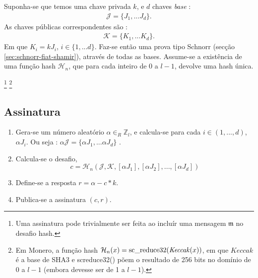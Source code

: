 Suponha-se que temos uma chave privada $k$, e $d$ chaves {\em base} :
\vspace{.175cm}
\begin{align*}
\mathcal{J} = \{J_1,...J_d\} .
\end{align*}
As chaves públicas correspondentes são :
\vspace{.175cm}
\begin{align*}
\mathcal{K} = \{K_1,...K_d\} .
\end{align*}
Em que $K_i = k J_i$, $i \in \{1,...d\}$. Faz-se então uma prova tipo Schnorr (secção \ref{sec:schnorr-fiat-shamir}), através de todas as bases. Assume-se a existência de uma função hash \(\mathcal{H}_n\), que para cada inteiro de 0 a $l-1$, devolve uma hash única.      

\footnote{Uma assinatura pode trivialmente ser feita ao incluír uma mensagem $\mathfrak{m}$ no desafio hash.}
\footnote{Em Monero, a função hash $\mathcal{H}_n(x) = \textrm{sc\textunderscore reduce32}(\mathit{Keccak}(x))$, em que $\mathit{Keccak}$ é a base de SHA3 e sc\textunderscore reduce32() põem o resultado de 256 bits no domínio de 0 a $l-1$ (embora devesse ser de 1 a $l-1$).}
\subsection*{Assinatura}
\begin{enumerate}
	\item Gera-se um número aleatório $\alpha \in_R \mathbb{Z}_l$, e calcula-se para cada $i \in (1,...,d)$, $\alpha J_i$. Ou seja : $\alpha \mathcal{J} = \{\alpha J_1,...\alpha J_d\} $ .    
	\item Calcula-se o desafio,\vspace{.175cm}
	\[c = \mathcal{H}_n(\mathcal{J},\mathcal{K},[\alpha J_1],[\alpha J_2],...,[\alpha J_d])\]
	\item Define-se a resposta $r = \alpha - c*k$.
	\item Publica-se a assinatura $(c, r)$.
\end{enumerate}

